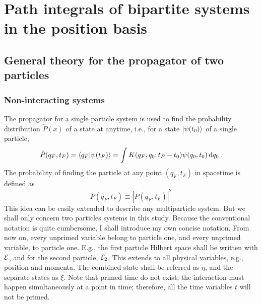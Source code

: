\chapter{Path integrals of bipartite systems in the position basis}

\section{General theory for the propagator of two particles}
\label{sec:general_theory_propagator_position}

\subsection{Non-interacting systems}

The propagator for a single particle system is used to find the probability distribution $\tilde{P}(x)$ of a state at anytime, i.e., for a state $\ket{\psi(t_0)}$ of a single particle,
\begin{equation}
    \tilde{P}(q_F, t_F) = \braket{q_F}{\psi(t_F)} = \int K(q_F, q_0; t_F - t_0)\psi(q_0, t_0)\dd{q_0}.
\end{equation}
The probability of finding the particle at any point $(q_F, t_F)$ in spacetime is defined as
\begin{equation}
    P(q_F, t_F) \equiv |\tilde{P}(q_F, t_F)|^2
\end{equation}
This idea can be easily extended to describe any multiparticle system. But we shall only concern two particles systems in this study. Because the conventional notation is quite cumbersome, I shall introduce my own concise notation. From now on, every unprimed variable belong to particle one, and every unprimed variable, to particle one. E.g., the first particle Hilbert space shall be written with $\mathcal{E}$, and for the second particle, $\mathcal{E}_2$. This extends to all physical variables, e.g., position and momenta. The combined state shall be referred as $\eta$, and the separate states as $\xi$. Note that primed time do not exist; the interaction must happen simultaneously at a point in time; therefore, all the time variables $t$ will not be primed.

